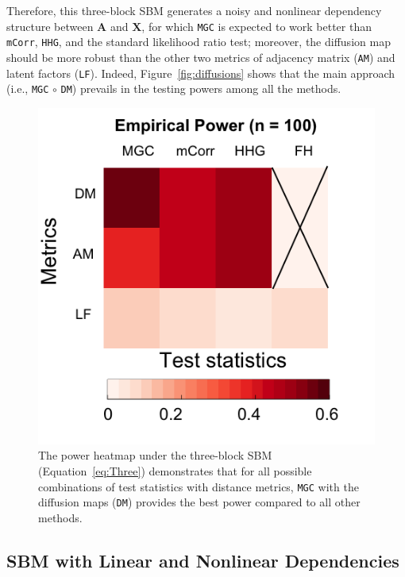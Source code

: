 \documentclass[12pt]{article}
\theoremstyle{definition}
\begin{document}
	Therefore, this three-block SBM generates a noisy and nonlinear dependency structure between $\mathbf{A}$ and $\mathbf{X}$, for which \texttt{MGC} is expected to work better than \texttt{mCorr}, \texttt{HHG}, and the standard likelihood ratio test; moreover, the diffusion map should be more robust than the other two metrics of adjacency matrix (\texttt{AM}) and latent factors (\texttt{LF}). Indeed, Figure~\ref{fig:diffusions} shows that the main approach (i.e., \texttt{MGC} $\circ$ \texttt{DM}) prevails in the testing powers among all the methods.
	
	\begin{figure}
		\centering
		\includegraphics[width=0.4\paperwidth, height=0.4\paperwidth]{../Figure/ThreeSBM_Elbow3.png}
		\caption{The power heatmap under the three-block SBM (Equation~\ref{eq:Three}) demonstrates that for all possible combinations of test statistics with distance metrics, \texttt{MGC} with the diffusion maps (\texttt{DM}) provides the best power compared to all other methods.}
		\label{fig:threeSBM}
	\end{figure}
	
	\subsection{SBM with Linear and Nonlinear Dependencies}
	
\end{document}
